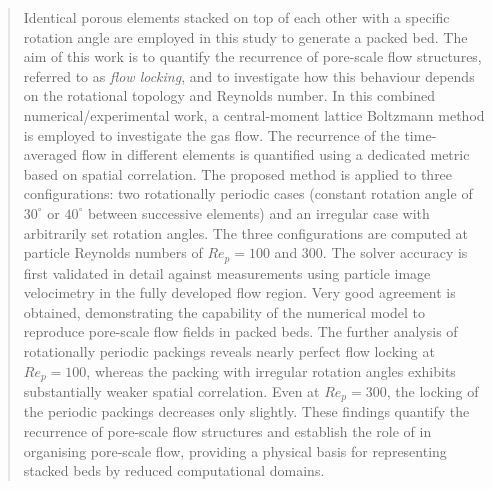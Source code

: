 \author{Tanya Neeraj}
\author{Farshad Gharibi}
\author{Christin Velten}
\author{Fathollah Varnik}
\author{Katharina Z\"ahringer}
\author{Dominique Th\'evenin   
}
\date{\today}
\begin{abstract}

Identical porous elements stacked on top of each other with a specific rotation angle are employed in this study to generate a packed bed. The aim of this work is to quantify the recurrence of pore-scale flow structures, referred to as \emph{flow locking}, and to investigate how this behaviour depends on the rotational topology and Reynolds number. In this combined numerical/experimental work, a central-moment lattice Boltzmann method is employed to investigate the gas flow. The recurrence of the time-averaged flow in different elements is quantified using a dedicated metric based on spatial correlation. The proposed method is applied to three configurations: two rotationally periodic cases (constant rotation angle of $30^\circ$ or $40^\circ$ between successive elements) and an irregular case with arbitrarily set rotation angles. The three configurations are computed at particle Reynolds numbers of $Re_p = 100$ and $300$. The solver accuracy is first validated in detail against measurements using particle image velocimetry in the fully developed flow region. Very good agreement is obtained, demonstrating the capability of the numerical model to reproduce pore-scale flow fields in packed beds. The further analysis of rotationally periodic packings reveals nearly perfect flow locking at $Re_p = 100$, whereas the packing with irregular rotation angles exhibits substantially weaker spatial correlation. Even at $Re_p = 300$, the locking of the periodic packings decreases only slightly. These findings quantify the recurrence of pore-scale flow structures and establish the role of  in organising pore-scale flow, providing a physical basis for representing  stacked beds by reduced computational domains.


\end{abstract}
